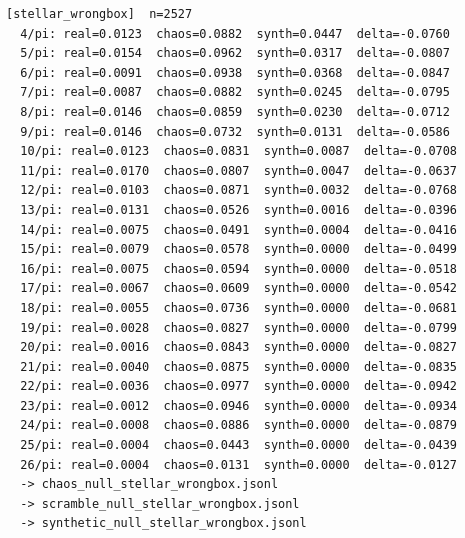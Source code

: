 \documentclass[11pt, letterpaper, openany]{book}
\begin{document}
\begin{empiricalbox}
\begin{lstlisting}[style=terminal]
[stellar_wrongbox]  n=2527
  4/pi: real=0.0123  chaos=0.0882  synth=0.0447  delta=-0.0760
  5/pi: real=0.0154  chaos=0.0962  synth=0.0317  delta=-0.0807
  6/pi: real=0.0091  chaos=0.0938  synth=0.0368  delta=-0.0847
  7/pi: real=0.0087  chaos=0.0882  synth=0.0245  delta=-0.0795
  8/pi: real=0.0146  chaos=0.0859  synth=0.0230  delta=-0.0712
  9/pi: real=0.0146  chaos=0.0732  synth=0.0131  delta=-0.0586
  10/pi: real=0.0123  chaos=0.0831  synth=0.0087  delta=-0.0708
  11/pi: real=0.0170  chaos=0.0807  synth=0.0047  delta=-0.0637
  12/pi: real=0.0103  chaos=0.0871  synth=0.0032  delta=-0.0768
  13/pi: real=0.0131  chaos=0.0526  synth=0.0016  delta=-0.0396
  14/pi: real=0.0075  chaos=0.0491  synth=0.0004  delta=-0.0416
  15/pi: real=0.0079  chaos=0.0578  synth=0.0000  delta=-0.0499
  16/pi: real=0.0075  chaos=0.0594  synth=0.0000  delta=-0.0518
  17/pi: real=0.0067  chaos=0.0609  synth=0.0000  delta=-0.0542
  18/pi: real=0.0055  chaos=0.0736  synth=0.0000  delta=-0.0681
  19/pi: real=0.0028  chaos=0.0827  synth=0.0000  delta=-0.0799
  20/pi: real=0.0016  chaos=0.0843  synth=0.0000  delta=-0.0827
  21/pi: real=0.0040  chaos=0.0875  synth=0.0000  delta=-0.0835
  22/pi: real=0.0036  chaos=0.0977  synth=0.0000  delta=-0.0942
  23/pi: real=0.0012  chaos=0.0946  synth=0.0000  delta=-0.0934
  24/pi: real=0.0008  chaos=0.0886  synth=0.0000  delta=-0.0879
  25/pi: real=0.0004  chaos=0.0443  synth=0.0000  delta=-0.0439
  26/pi: real=0.0004  chaos=0.0131  synth=0.0000  delta=-0.0127
  -> chaos_null_stellar_wrongbox.jsonl
  -> scramble_null_stellar_wrongbox.jsonl
  -> synthetic_null_stellar_wrongbox.jsonl


\end{lstlisting}
\end{empiricalbox}
\end{document}
